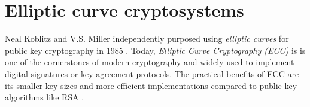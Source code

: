 \section{Elliptic curve cryptosystems}

Neal Koblitz and V.S. Miller independently purposed using \emph{elliptic curves} for public key cryptography in 1985 \cite{bruce, bruce867, bruce1095}. Today, \emph{Elliptic Curve Cryptography (ECC)} is is one of the cornerstones of modern cryptography and widely used to implement digital signatures or key agreement protocols. The practical benefits of ECC are its smaller key sizes and more efficient implementations compared to public-key algorithms like RSA \cite{rsa, eddsa, rsavsecc}.
